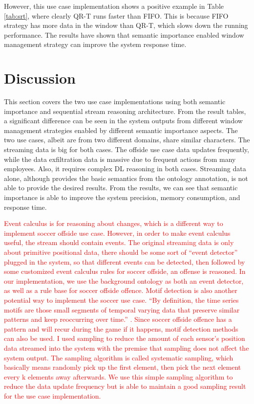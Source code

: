 However, this use case implementation shows a positive example in Table \ref{tab:srt}, where clearly QR-T runs faster than FIFO. 
This is because FIFO strategy has more data in the window than QR-T, which slows down the running performance.
The results have shown that semantic importance enabled window management strategy can improve the system response time. 
%
\section{Discussion}
This section covers the two use case implementations using both semantic importance and sequential stream reasoning architecture.
From the result tables, a significant difference can be seen in the system outputs from different window management strategies enabled by different semantic importance aspects. 
The two use cases, albeit are from two different domains, share similar characters. 
The streaming data is big for both cases. 
The offside use case data updates frequently, while the data exfiltration data is massive due to frequent actions from many employees. 
Also, it requires complex DL reasoning in both cases. 
Streaming data alone, although provides the basic semantics from the ontology annotation, is not able to provide the desired results. 
From the results, we can see that semantic importance is able to improve the system precision, memory consumption, and response time.

\textcolor{red}{
Event calculus \cite{khandelwal2013furthering} is for reasoning about changes, which is a different way to implement soccer offside use case. 
However, in order to make event calculus useful, the stream should contain events. 
The original streaming data is only about primitive positional data, there should be some sort of “event detector” plugged in the system, so that different events can be detected, 
then followed by some customized event calculus rules for soccer offside, an offense is reasoned. In our implementation, we use the background ontology as both an event detector, as well as a rule base for soccer offside offence. 
Motif detection \cite{chen2015context} is also another potential way to implement the soccer use case. 
``By definition, the time series motifs are those small segments of temporal varying data that preserve similar patterns and keep reoccurring over time.'' \cite{chen2015context}. 
Since soccer offside offence has a pattern and will recur during the game if it happens, motif detection methods can also be used.
I used sampling to reduce the amount of each sensor’s position data streamed into the system with the premise that sampling does not affect the system output. 
The sampling algorithm is called systematic sampling, which basically means randomly pick up the first element, then pick the next element every k elements away afterwards. 
We use this simple sampling algorithm to reduce the data update frequency but is able to maintain a good sampling result for the use case implementation.}

